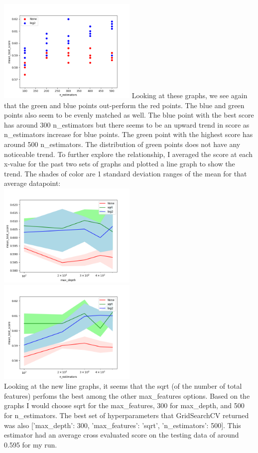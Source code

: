 \documentclass[12pt]{article}
\begin{document}
\includegraphics[width=0.5\textwidth]{RF_n_estimators3.png}
Looking at these graphs, we see again that the green and blue points out-perform the red points. The blue and green points also seem to be evenly matched as well. The blue point with the best score has around 300 n\_estimators but there seems to be an upward trend in score as n\_estimators increase for blue points. The green point with the highest score has around 500 n\_estimators. The distribution of green points does not have any noticeable trend. To further explore the relationship, I averaged the score at each x-value for the past two sets of graphs and plotted a line graph to show the trend. The shades of color are 1 standard deviation ranges of the mean for that average datapoint: \\
\includegraphics[width=0.5\textwidth]{RF_max_depth_line.png}
\includegraphics[width=0.5\textwidth]{RF_n_estimators_line.png}
\\
Looking at the new line graphs, it seems that the sqrt (of the number of total features) perfoms the best among the other max\_features options. Based on the graphs I would choose sqrt for the max\_features, 300 for max\_depth, and 500 for n\_estimators. The best set of hyperparameters that GridSearchCV returned was also ['max\_depth': 300, 'max\_features': 'sqrt', 'n\_estimators': 500]. This estimator had an average cross evaluated score on the testing data of around 0.595 for my run.
\end{document}
